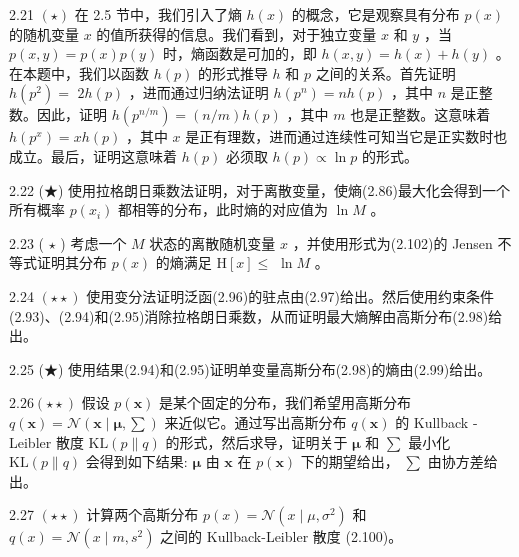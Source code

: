 \documentclass[10pt]{article}
\begin{document}
2.21 \(\left( \star \right)\) 在 2.5 节中，我们引入了熵 \(h\left( x\right)\) 的概念，它是观察具有分布 \(p\left( x\right)\) 的随机变量 \(x\) 的值所获得的信息。我们看到，对于独立变量 \(x\) 和 \(y\) ，当 \(p\left( {x,y}\right)  = p\left( x\right) p\left( y\right)\) 时，熵函数是可加的，即 \(h\left( {x,y}\right)  = h\left( x\right)  + h\left( y\right)\) 。在本题中，我们以函数 \(h\left( p\right)\) 的形式推导 \(h\) 和 \(p\) 之间的关系。首先证明 \(h\left( {p}^{2}\right)  =\)  \({2h}\left( p\right)\) ，进而通过归纳法证明 \(h\left( {p}^{n}\right)  = {nh}\left( p\right)\) ，其中 \(n\) 是正整数。因此，证明 \(h\left( {p}^{n/m}\right)  = \left( {n/m}\right) h\left( p\right)\) ，其中 \(m\) 也是正整数。这意味着 \(h\left( {p}^{x}\right)  = {xh}\left( p\right)\) ，其中 \(x\) 是正有理数，进而通过连续性可知当它是正实数时也成立。最后，证明这意味着 \(h\left( p\right)\) 必须取 \(h\left( p\right)  \propto  \ln p\) 的形式。

2.22 (★) 使用拉格朗日乘数法证明，对于离散变量，使熵(2.86)最大化会得到一个所有概率 \(p\left( {x}_{i}\right)\) 都相等的分布，此时熵的对应值为 \(\ln M\) 。

2.23 ( \(\star\) ) 考虑一个 \(M\) 状态的离散随机变量 \(x\) ，并使用形式为(2.102)的 Jensen 不等式证明其分布 \(p\left( x\right)\) 的熵满足 \(\mathrm{H}\left\lbrack  x\right\rbrack   \leq\)  \(\ln M\) 。

2.24 \(\left( {\star  \star  }\right)\) 使用变分法证明泛函(2.96)的驻点由(2.97)给出。然后使用约束条件(2.93)、(2.94)和(2.95)消除拉格朗日乘数，从而证明最大熵解由高斯分布(2.98)给出。

2.25 (★) 使用结果(2.94)和(2.95)证明单变量高斯分布(2.98)的熵由(2.99)给出。

\({2.26}\left( {\star  \star  }\right)\) 假设 \(p\left( \mathbf{x}\right)\) 是某个固定的分布，我们希望用高斯分布 \(q\left( \mathbf{x}\right)  = \mathcal{N}\left( {\mathbf{x} \mid  \mathbf{\mu },\mathbf{\sum }}\right)\) 来近似它。通过写出高斯分布 \(q\left( \mathbf{x}\right)\) 的 Kullback - Leibler 散度 \(\mathrm{{KL}}\left( {p\parallel q}\right)\) 的形式，然后求导，证明关于 \(\mathbf{\mu }\) 和 \(\mathbf{\sum }\) 最小化 \(\mathrm{{KL}}\left( {p\parallel q}\right)\) 会得到如下结果: \(\mathbf{\mu }\) 由 \(\mathbf{x}\) 在 \(p\left( \mathbf{x}\right)\) 下的期望给出， \(\mathbf{\sum }\) 由协方差给出。

2.27 \(\left( {\star  \star  }\right)\) 计算两个高斯分布 \(p\left( x\right)  = \mathcal{N}\left( {x \mid  \mu ,{\sigma }^{2}}\right)\) 和 \(q\left( x\right)  = \mathcal{N}\left( {x \mid  m,{s}^{2}}\right)\) 之间的 Kullback-Leibler 散度 (2.100)。
\end{document}
